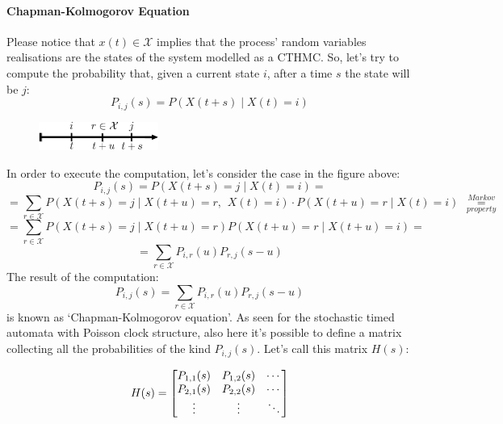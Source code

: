 \documentclass[12pt,a4paper]{article}
\begin{document}
\paragraph{Chapman-Kolmogorov Equation}
Please notice that $x(t)\in \mathcal{X}$ implies that the process' random variables realisations are the states of the system modelled as a CTHMC. So, let's try to compute the probability that, given a current state $i$, after a time $s$ the state will be $j$:
$$
P_{i,j}(s)=P\left(X\left(t+s\right) \mid  X\left(t\right)=i\right)
$$
\begin{figure}[H]
\begin{center}
\includegraphics[width=0.35\textwidth]{IMG/CTHMC1.eps}
\label{Picture 3}
\end{center}
\end{figure}
\noindent
In order to execute the computation, let's consider the case in the figure above:
$$
P_{i,j}(s)=P\left(X\left(t+s\right)=j \mid  X\left(t\right)=i\right)=
$$
$$
=\sum_{r\in \mathcal{X}}{
P\left(X\left(t+s\right)=j \mid  X\left(t+u\right)=r,\hspace{5pt} X\left(t\right)=i\right)
}\cdot 
P\left(X\left(t+u\right)=r \mid X\left(t\right)=i\right)
\hspace{5pt}\overset{Markov}{\underset{property}{=}}
$$
$$
=\sum_{r\in \mathcal{X}}{
P\left(X\left(t+s\right)=j \mid  X\left(t+u\right)=r\right)
P\left(X\left(t+u\right)=r \mid  X\left(t+u\right)=i\right)
}=
$$
$$
=\sum_{r\in \mathcal{X}}{
P_{i,r}\left(u\right)
P_{r,j}\left(s-u\right)
}
$$
The result of the computation:
\begin{equation}
P_{i,j}(s)
=\sum_{r\in \mathcal{X}}{
P_{i,r}\left(u\right)
P_{r,j}\left(s-u\right)
}
\end{equation}
is known as `Chapman-Kolmogorov equation'. As seen for the stochastic timed automata with Poisson clock structure, also here it's possible to define a matrix collecting all the probabilities of the kind $P_{i,j}(s)$. Let's call this matrix $H(s)$:

\bigskip\noindent
$$
H(s)=\left[
\begin{matrix}
P_{1,1}(s)&P_{1,2}(s)&\cdots\cr
P_{2,1}(s)&P_{2,2}(s)&\cdots\cr
\vdots&\vdots&\ddots
\end{matrix}
\right]
$$
\end{document}
